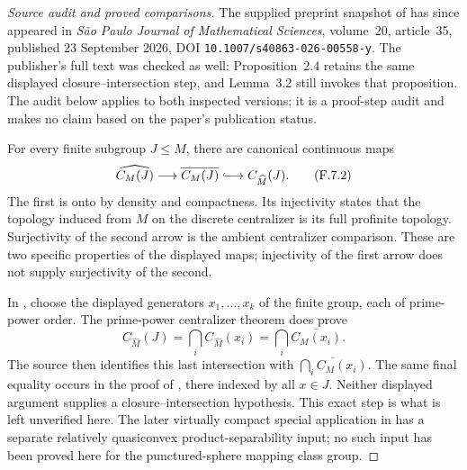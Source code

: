 \begin{proof}[Source audit and proved comparisons]
The supplied preprint snapshot of \cite{R-Boggi}
has since appeared in \emph{S\~ao Paulo Journal of
Mathematical Sciences}, volume~20, article~35,
published 23 September 2026, DOI
\texttt{10.1007/s40863-026-00558-y}.
The publisher's full text was checked as well:
Proposition~2.4 retains the same displayed
closure--intersection step, and Lemma~3.2
still invokes that proposition.
The audit below applies to both inspected versions;
it is a proof-step audit and makes no claim based
on the paper's publication status.

For every finite subgroup $J\le M$, there are canonical
continuous maps
\[
 \widehat{C_M(J)}\longrightarrow
       \overline{C_M(J)}\lhook\joinrel\longrightarrow
       C_{\widehat M}(J).                              \tag{F.7.2}
\]
The first is onto by density and compactness. Its
injectivity states that the topology induced from $M$
on the discrete centralizer is its full profinite
topology. Surjectivity of the second arrow is the
ambient centralizer comparison. These are two specific
properties of the displayed maps; injectivity of the
first arrow does not supply surjectivity of the second.

In \cite[Proposition~2.4]{R-Boggi}, choose the displayed
generators $x_1,\ldots,x_k$ of the finite group, each of
prime-power order. The prime-power centralizer theorem
does prove
\[
 C_{\widehat M}(J)
   =\bigcap_i C_{\widehat M}(x_i)
   =\bigcap_i\overline{C_M(x_i)}.                      \tag{F.7.3}
\]
The source then identifies this last intersection with
$\overline{\bigcap_i C_M(x_i)}$. The same final equality
occurs in the proof of
\cite[Theorem~5.1(iii)]{R-BZ}, there indexed by all
$x\in J$. Neither displayed argument supplies a
closure--intersection hypothesis. This exact step is
what is left unverified here. The later virtually
compact special application in \cite[\S6.2]{R-BZ}
has a separate relatively quasiconvex product-separability
input; no such input has been proved here for the
punctured-sphere mapping class group.


\end{proof}
